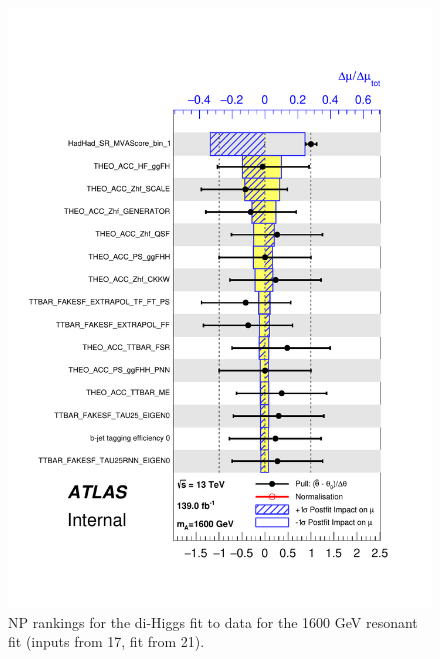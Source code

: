 \begin{figure}
\centering
\includegraphics[width=.8\textwidth]{figures/results/HH/HadHad/HadHadFit21062021/PullsAndRankings/pulls_SigXsecOverSM_1600.pdf}
\caption{NP rankings for the di-Higgs \hadhad fit to data for the 1600 GeV resonant fit (inputs from 17, fit from 21).}
\label{fig:HadHadPostfitNPRankings2HDM1600}
\end{figure}

